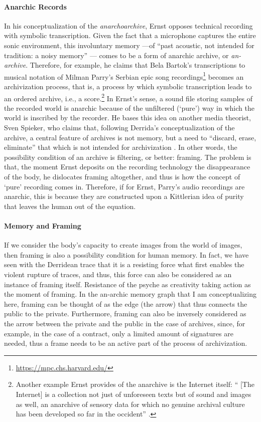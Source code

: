 \paragraph{Anarchic Records}
In his conceptualization of the \textit{anarchoarchive}, Ernst \parencite{Ern13:Dig} opposes technical recording with symbolic transcription. Given the fact that a microphone captures the entire sonic environment, this involuntary memory ---of ``past acoustic, not intended for tradition: a noisy memory'' \parencite[174]{Ern13:Dig}--- comes to be a form of anarchic archive, or \textit{an-archive}. Therefore, for example, he claims that Bela Bartok's transcriptions to musical notation of Milman Parry's Serbian epic song recordings\footnote{\url{https://mpc.chs.harvard.edu/}} becomes an archivization process, that is, a process by which symbolic transcription leads to an ordered archive, i.e., a score.\footnote{Another example Ernst provides of the anarchive is the Internet itself: `` [The Internet] is a collection not just of unforeseen texts but of sound and images as well, an anarchive of sensory data for which no genuine archival culture has been developed so far in the occident'' \parencite[139]{Ern13:Dig}.} In Ernst's sense, a sound file storing samples of the recorded world is anarchic because of the unfiltered (`pure') way in which the world is inscribed by the recorder. He bases this idea on another media theorist, Sven Spieker, who claims that, following Derrida's conceptualization of the archive, a central feature of archives is not memory, but a need to ``discard, erase, eliminate'' that which is not intended for archivization \parencite[113]{Ern13:Dig}. In other words, the possibility condition of an archive is filtering, or better: framing. The problem is that, the moment Ernst deposits on the recording technology the disappearance of the body, he dislocates framing altogether, and thus is how the concept of `pure' recording comes in. Therefore, if for Ernst, Parry's audio recordings are anarchic, this is because they are constructed upon a Kittlerian idea of purity that leaves the human out of the equation.

\paragraph{Memory and Framing}
If we consider the body's capacity to create images from the world of images, then framing is also a possibility condition for human memory. In fact, we have seen with the Derridean trace that it is a resisting force what first enables the violent rupture of traces, and thus, this force can also be considered as an instance of framing itself. Resistance of the psyche as creativity taking action as the moment of framing. In the an-archic memory graph that I am conceptualizing here, framing can be thought of as the edge (the arrow) that thus connects the public to the private. Furthermore, framing can also be inversely considered as the arrow between the private and the public in the case of archives, since, for example, in the case of a contract, only a limited amount of signatures are needed, thus a frame needs to be an active part of the process of archivization.

